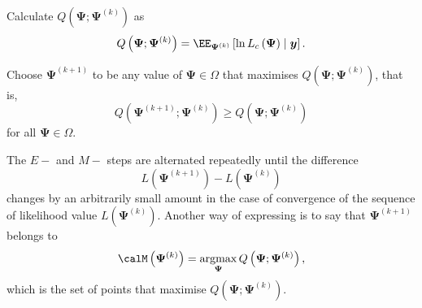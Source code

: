 \begin{defe}[$E-$step] \label{defe: e_step}
    Calculate $Q \left( \bm{\Psi} ; \bm{\Psi}^{(k)} \right)$ as
    \begin{equation*}
        Q \left( \bm{\Psi} ; \bm{\Psi}^{(k)} \right) = \EE_{\bm{\Psi}^{(k)}} \left[ \ln L_c \left( \bm{\Psi} \right) \mid \bm{y} \right].
    \end{equation*}
\end{defe}

\begin{defe}[$M-$step] \label{defe: m_step}
    Choose $\bm{\Psi}^{(k+1)}$ to be any value of $\bm{\Psi} \in \Omega$ that maximises $Q \left( \bm{\Psi} ; \bm{\Psi}^{(k)} \right)$, that is,
    \begin{equation*}
        Q \left( \bm{\Psi}^{(k+1)} ; \bm{\Psi}^{(k)} \right) \geq Q \left( \bm{\Psi} ; \bm{\Psi}^{(k)} \right)
    \end{equation*}
    for all $\bm{\Psi} \in \Omega$.
\end{defe}

The $E-$ and $M-$ steps are alternated repeatedly until the difference
\begin{equation*}
    L (\bm{\Psi}^{(k+1)}) - L (\bm{\Psi}^{(k)})
\end{equation*}
changes by an arbitrarily small amount in the case of convergence of the sequence of likelihood value $L (\bm{\Psi}^{(k)})$. Another way of expressing  is to say that $\bm{\Psi}^{(k+1)}$ belongs to
\begin{equation*}
    \calM \left( \bm{\Psi}^{(k)} \right) = \operatornamewithlimits{argmax}_{\bm{\Psi}} Q \left( \bm{\Psi} ; \bm{\Psi}^{(k)} \right),
\end{equation*}
which is the set of points that maximise $Q \left( \bm{\Psi} ; \bm{\Psi}^{(k)} \right)$.

